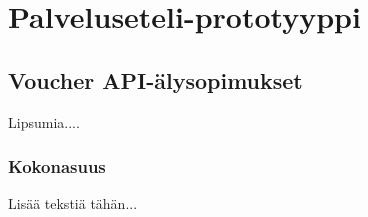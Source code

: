 \section{Palveluseteli-prototyyppi}

\subsection{Voucher API-älysopimukset}

Lipsumia....

\subsubsection {Kokonasuus}

Lisää tekstiä tähän...
